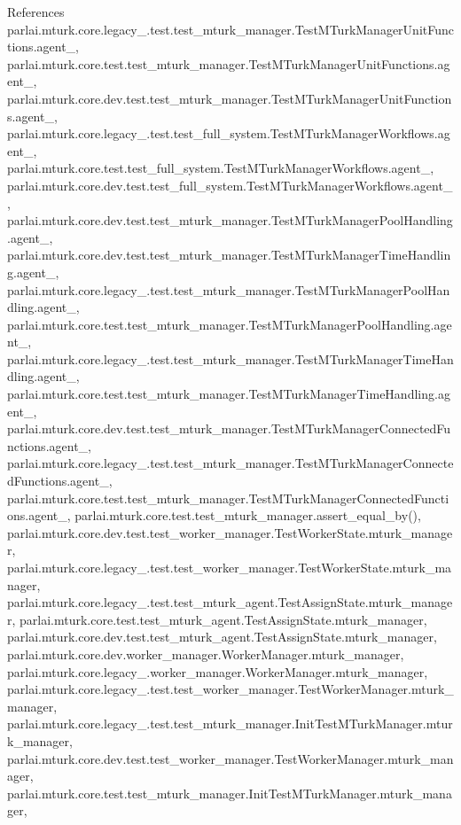 References parlai.\+mturk.\+core.\+legacy\+\_.\+test.\+test\+\_\+mturk\+\_\+manager.\+Test\+M\+Turk\+Manager\+Unit\+Functions.\+agent\+\_, parlai.\+mturk.\+core.\+test.\+test\+\_\+mturk\+\_\+manager.\+Test\+M\+Turk\+Manager\+Unit\+Functions.\+agent\+\_, parlai.\+mturk.\+core.\+dev.\+test.\+test\+\_\+mturk\+\_\+manager.\+Test\+M\+Turk\+Manager\+Unit\+Functions.\+agent\+\_, parlai.\+mturk.\+core.\+legacy\+\_.\+test.\+test\+\_\+full\+\_\+system.\+Test\+M\+Turk\+Manager\+Workflows.\+agent\+\_, parlai.\+mturk.\+core.\+test.\+test\+\_\+full\+\_\+system.\+Test\+M\+Turk\+Manager\+Workflows.\+agent\+\_, parlai.\+mturk.\+core.\+dev.\+test.\+test\+\_\+full\+\_\+system.\+Test\+M\+Turk\+Manager\+Workflows.\+agent\+\_, parlai.\+mturk.\+core.\+dev.\+test.\+test\+\_\+mturk\+\_\+manager.\+Test\+M\+Turk\+Manager\+Pool\+Handling.\+agent\+\_, parlai.\+mturk.\+core.\+dev.\+test.\+test\+\_\+mturk\+\_\+manager.\+Test\+M\+Turk\+Manager\+Time\+Handling.\+agent\+\_, parlai.\+mturk.\+core.\+legacy\+\_.\+test.\+test\+\_\+mturk\+\_\+manager.\+Test\+M\+Turk\+Manager\+Pool\+Handling.\+agent\+\_, parlai.\+mturk.\+core.\+test.\+test\+\_\+mturk\+\_\+manager.\+Test\+M\+Turk\+Manager\+Pool\+Handling.\+agent\+\_, parlai.\+mturk.\+core.\+legacy\+\_.\+test.\+test\+\_\+mturk\+\_\+manager.\+Test\+M\+Turk\+Manager\+Time\+Handling.\+agent\+\_, parlai.\+mturk.\+core.\+test.\+test\+\_\+mturk\+\_\+manager.\+Test\+M\+Turk\+Manager\+Time\+Handling.\+agent\+\_, parlai.\+mturk.\+core.\+dev.\+test.\+test\+\_\+mturk\+\_\+manager.\+Test\+M\+Turk\+Manager\+Connected\+Functions.\+agent\+\_, parlai.\+mturk.\+core.\+legacy\+\_.\+test.\+test\+\_\+mturk\+\_\+manager.\+Test\+M\+Turk\+Manager\+Connected\+Functions.\+agent\+\_, parlai.\+mturk.\+core.\+test.\+test\+\_\+mturk\+\_\+manager.\+Test\+M\+Turk\+Manager\+Connected\+Functions.\+agent\+\_, parlai.\+mturk.\+core.\+test.\+test\+\_\+mturk\+\_\+manager.\+assert\+\_\+equal\+\_\+by(), parlai.\+mturk.\+core.\+dev.\+test.\+test\+\_\+worker\+\_\+manager.\+Test\+Worker\+State.\+mturk\+\_\+manager, parlai.\+mturk.\+core.\+legacy\+\_.\+test.\+test\+\_\+worker\+\_\+manager.\+Test\+Worker\+State.\+mturk\+\_\+manager, parlai.\+mturk.\+core.\+legacy\+\_.\+test.\+test\+\_\+mturk\+\_\+agent.\+Test\+Assign\+State.\+mturk\+\_\+manager, parlai.\+mturk.\+core.\+test.\+test\+\_\+mturk\+\_\+agent.\+Test\+Assign\+State.\+mturk\+\_\+manager, parlai.\+mturk.\+core.\+dev.\+test.\+test\+\_\+mturk\+\_\+agent.\+Test\+Assign\+State.\+mturk\+\_\+manager, parlai.\+mturk.\+core.\+dev.\+worker\+\_\+manager.\+Worker\+Manager.\+mturk\+\_\+manager, parlai.\+mturk.\+core.\+legacy\+\_.\+worker\+\_\+manager.\+Worker\+Manager.\+mturk\+\_\+manager, parlai.\+mturk.\+core.\+legacy\+\_.\+test.\+test\+\_\+worker\+\_\+manager.\+Test\+Worker\+Manager.\+mturk\+\_\+manager, parlai.\+mturk.\+core.\+legacy\+\_.\+test.\+test\+\_\+mturk\+\_\+manager.\+Init\+Test\+M\+Turk\+Manager.\+mturk\+\_\+manager, parlai.\+mturk.\+core.\+dev.\+test.\+test\+\_\+worker\+\_\+manager.\+Test\+Worker\+Manager.\+mturk\+\_\+manager, parlai.\+mturk.\+core.\+test.\+test\+\_\+mturk\+\_\+manager.\+Init\+Test\+M\+Turk\+Manager.\+mturk\+\_\+manager, 